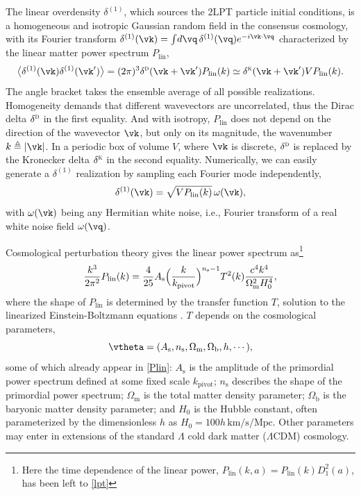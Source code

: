 \documentclass[modern, dvipsnames]{aastex631}
\newcommand{\deltaD}{\delta^\textsc{d}}
\newcommand{\deltaK}{\delta^\textsc{k}}
\renewcommand{\d}{d}
\newcommand{\As}{A_\mathrm{s}}
\newcommand{\ns}{n_\mathrm{s}}
\newcommand{\Omegam}{\Omega_\mathrm{m}}
\newcommand{\Omegab}{\Omega_\mathrm{b}}
\newcommand{\Mpc}{\mathrm{Mpc}}
\newcommand{\Plin}{P_\mathrm{lin}}
\begin{document}
The linear overdensity $\delta^{(1)}$, which sources the 2LPT particle
initial conditions, is a homogeneous and isotropic Gaussian random field
in the consensus cosmology, with its Fourier transform
$\delta^{(1)}(\vk) = \int\!\d\vq\, \delta^{(1)}(\vq) e^{- i \vk \cdot
\vq}$ characterized by the linear matter power spectrum $\Plin$,
%
\begin{equation}
\bigl\langle \delta^{(1)}(\vk) \delta^{(1)}(\vk') \bigr\rangle
= (2\pi)^3 \deltaD(\vk + \vk') \Plin(k)
\simeq \deltaK(\vk + \vk') V \Plin(k).
\end{equation}
%
The angle bracket takes the ensemble average of all possible
realizations.
Homogeneity demands that different wavevectors are uncorrelated, thus
the Dirac delta $\deltaD$ in the first equality.
And with isotropy, $\Plin$ does not depend on the direction of the
wavevector $\vk$, but only on its magnitude, the wavenumber $k
\triangleq |\vk|$.
In a periodic box of volume $V$, where $\vk$ is discrete, $\deltaD$ is
replaced by the Kronecker delta $\deltaK$ in the second equality.
Numerically, we can easily generate a $\delta^{(1)}$ realization by
sampling each Fourier mode independently,
%
\begin{equation}
\delta^{(1)}(\vk) = \sqrt{V \Plin(k)} \, \omega(\vk),
\end{equation}
%
with $\omega(\vk)$ being any Hermitian white noise, i.e., Fourier
transform of a real white noise field $\omega(\vq)$.

Cosmological perturbation theory gives the linear power spectrum
as\footnote{Here the time dependence of the linear power, $\Plin(k, a) =
\Plin(k) D_1^2(a)$, has been left to \eqref{lpt}}
%
\begin{equation}
\frac{k^3}{2\pi^2} \Plin(k)
= \frac{4}{25} \As
  \Bigl( \frac{k}{k_\mathrm{pivot}} \Bigr)^{\ns - 1}
  T^2(k) \frac{c^4 k^4}{\Omegam^2 H_0^4},
\label{Plin}
\end{equation}
%
where the shape of $\Plin$ is determined by the transfer function $T$,
solution to the linearized Einstein-Boltzmann equations \citep{CAMB,
CLASS}.
$T$ depends on the cosmological parameters,
%
\begin{equation*}
\vtheta = (
  \As, \ns, \Omegam, \Omegab, h, \cdots),
\end{equation*}
%
some of which already appear in \eqref{Plin}: $\As$ is the amplitude of
the primordial power spectrum defined at some fixed scale
$k_\mathrm{pivot}$; $\ns$ describes the shape of the primordial power
spectrum; $\Omegam$ is the total matter density parameter; $\Omegab$ is
the baryonic matter density parameter; and $H_0$ is the Hubble constant,
often parameterized by the dimensionless $h$ as $H_0 = 100 h \,
\mathrm{km}/\mathrm{s}/\Mpc$.
Other parameters may enter in extensions of the standard $\Lambda$ cold
dark matter ($\Lambda$CDM) cosmology.
\end{document}
